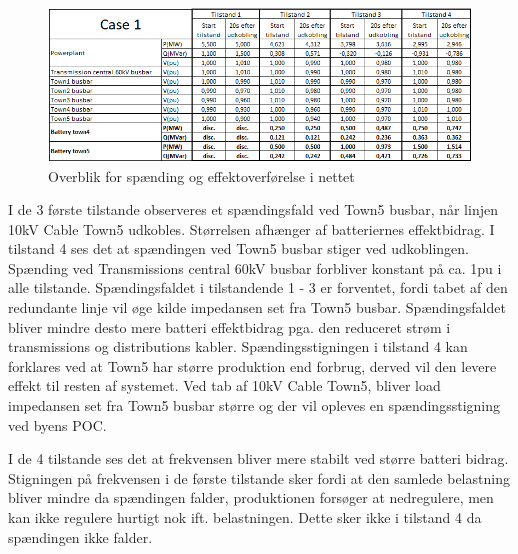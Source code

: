 \begin{figure}[H] %
	\centering
	\includegraphics[width=1\textwidth]{figurer/SmallDisturbance/Overview}
	\caption{Overblik for spænding og effektoverførelse i nettet}
	\label{fig:C1Overview}
\end{figure}


I de 3 første tilstande observeres et spændingsfald ved Town5 busbar, når linjen 10kV Cable Town5 udkobles. Størrelsen afhænger af batteriernes effektbidrag. I tilstand 4 ses det at spændingen ved Town5 busbar stiger ved udkoblingen. Spænding ved Transmissions central 60kV busbar forbliver konstant på ca. 1pu i alle tilstande. Spændingsfaldet i tilstandende 1 - 3 er forventet, fordi tabet af den redundante linje vil øge kilde impedansen set fra Town5 busbar. Spændingsfaldet bliver mindre desto mere batteri effektbidrag pga. den reduceret strøm i transmissions og distributions kabler. Spændingsstigningen i tilstand 4 kan forklares ved at Town5 har større produktion end forbrug, derved vil den levere effekt til resten af systemet. Ved tab af 10kV Cable Town5, bliver load impedansen set fra Town5 busbar større og der vil opleves en spændingsstigning ved byens POC.

I de 4 tilstande ses det at frekvensen bliver mere stabilt ved større batteri bidrag. Stigningen på frekvensen i de første tilstande sker fordi at den samlede belastning bliver mindre da spændingen falder, produktionen forsøger at nedregulere, men kan ikke regulere hurtigt nok ift. belastningen. Dette sker ikke i tilstand 4 da spændingen ikke falder.   
